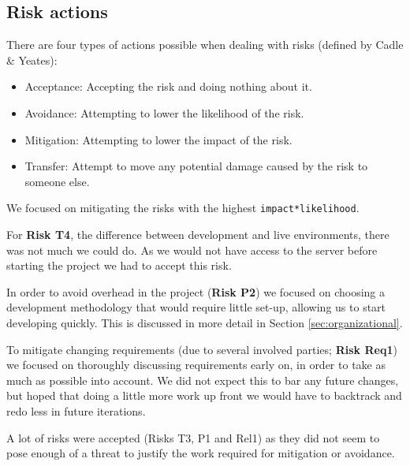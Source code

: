 \subsection{Risk actions}
There are four types of actions possible when dealing with risks (defined by Cadle \& Yeates):

\begin{itemize}
    \item Acceptance: Accepting the risk and doing nothing about it.
    \item Avoidance: Attempting to lower the likelihood of the risk.
    \item Mitigation: Attempting to lower the impact of the risk.
    \item Transfer: Attempt to move any potential damage caused by the risk to someone else.
\end{itemize}

We focused on mitigating the risks with the highest \verb+impact*likelihood+.

For \textbf{Risk T4}, the difference between development and live environments, there was not much we could
do. As we would not have access to the server before starting the project we had to accept this risk.

In order to avoid overhead in the project (\textbf{Risk P2}) we focused on choosing a development
methodology that would require little set-up, allowing us to start developing quickly. This is discussed in
more detail in Section \ref{sec:organizational}.

To mitigate changing requirements (due to several involved parties; \textbf{Risk Req1}) we focused on
thoroughly discussing requirements early on, in order to take as much as possible into account. We did not
expect this to bar any future changes, but hoped that doing a little more work up front we would have to
backtrack and redo less in future iterations.

A lot of risks were accepted (Risks T3, P1 and Rel1) as they did not seem to pose enough of a threat to
justify the work required for mitigation or avoidance.